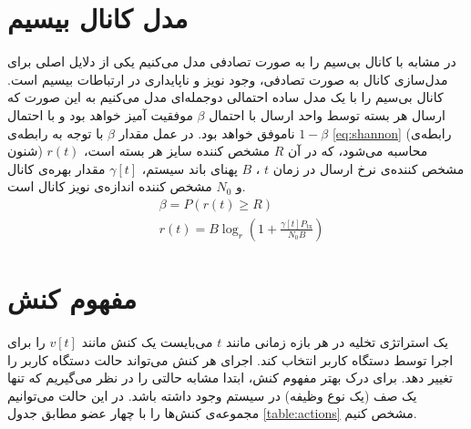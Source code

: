 \section{مدل کانال بیسیم}
\label{sec:wireless}
در \CurrentProject مشابه با \cite{Liu} کانال بی‌سیم را به صورت تصادفی مدل می‌کنیم یکی از دلایل اصلی برای مدل‌سازی کانال به صورت تصادفی، وجود نویز و ناپایداری در ارتباطات بیسیم است. کانال بی‌سیم را با یک مدل ساده احتمالی دوجمله‌ای  مدل می‌کنیم به این صورت که ارسال هر بسته توسط واحد ارسال با احتمال \(\beta\) موفقیت آمیز خواهد بود و با احتمال \(1 - \beta\) ناموفق خواهد بود. در عمل مقدار \(\beta\) با توجه به رابطه‌ی \ref{eq:shannon} (رابطه‌ی شنون) محاسبه می‌شود، که در آن \(R\) مشخص کننده سایز هر بسته است،
$r(t)$
مشخص کننده‌ی نرخ ارسال در زمان
$t$
،
 \(B\) پهنای باند سیستم، \(\gamma[t]\) مقدار بهره‌ی کانال و \(N_0\) مشخص کننده اندازه‌ی نویز کانال است.
\begin{equation}
	\label{eq:shannon}
	\begin{aligned}
		&\beta=P(r(t) \geq R) \\
		&r(t)=B \log _{r}\left(1+\frac{\gamma[t] P_{\mathrm{tx}}}{N_0 B}\right)
	\end{aligned}
\end{equation}
\section{مفهوم کنش}
\label{sec:action}
یک استراتژی تخلیه در هر بازه زمانی مانند \(t\) می‌بایست یک کنش مانند \(v[t]\) را برای اجرا توسط دستگاه کاربر انتخاب کند. اجرای هر کنش می‌تواند حالت دستگاه کاربر را تغییر دهد. برای درک بهتر مفهوم کنش، ابتدا مشابه \cite{Liu} حالتی را در نظر می‌گیریم که تنها یک صف (یک نوع وظیفه) در سیستم وجود داشته باشد. در این حالت می‌توانیم مجموعه‌ی کنش‌ها را با چهار عضو مطابق جدول \ref{table:actions} مشخص کنیم.

